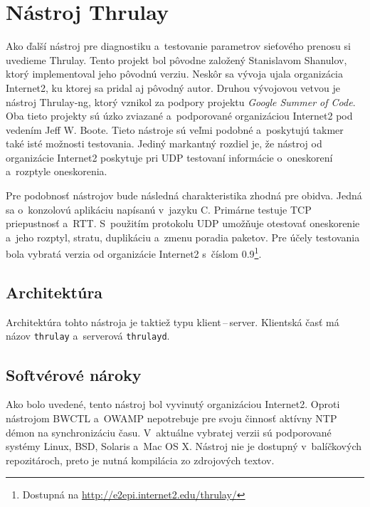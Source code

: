     \section{Nástroj Thrulay}
    Ako ďalší nástroj pre diagnostiku a~testovanie parametrov sieťového
    prenosu si uvedieme Thrulay. Tento projekt bol pôvodne založený Stanislavom 
    Shanulov, ktorý implementoval jeho pôvodnú verziu. Neskôr sa vývoja ujala
    organizácia Internet2, ku ktorej sa pridal aj pôvodný autor. Druhou
    vývojovou vetvou je nástroj Thrulay-ng, ktorý vznikol za podpory projektu 
    \emph{Google Summer of Code}. Oba tieto projekty sú úzko zviazané
    a~podporované organizáciou Internet2 pod vedením Jeff W. Boote. Tieto
    nástroje sú veľmi podobné a~poskytujú takmer také isté
    možnosti testovania. Jediný markantný rozdiel je, že nástroj od 
    organizácie Internet2 poskytuje pri UDP testovaní informácie
    o~oneskorení a~rozptyle oneskorenia.

    Pre podobnosť nástrojov bude následná charakteristika zhodná pre
    obidva. Jedná sa o~konzolovú aplikáciu napísanú v~jazyku C. Primárne testuje
    TCP priepustnosť a~RTT. S~použitím protokolu UDP umožňuje otestovať
    oneskorenie a~jeho rozptyl, stratu, duplikáciu a~zmenu poradia paketov.
    Pre účely testovania bola vybratá verzia od organizácie Internet2
    s~číslom 0.9\footnote{Dostupná na \url{http://e2epi.internet2.edu/thrulay/}}.


        \subsection{Architektúra}\label{thrulay_arch}
        Architektúra tohto nástroja je taktiež typu klient\,--\,server. Klientská
        časť má názov \texttt{thrulay} a~serverová \texttt{thrulayd}.

        \subsection{Softvérové nároky} \label{thrulay_sw}
        Ako bolo uvedené, tento nástroj bol vyvinutý organizáciou Internet2.
        Oproti nástrojom BWCTL a~OWAMP nepotrebuje pre svoju činnosť aktívny 
        NTP démon na synchronizáciu času. V~aktuálne vybratej verzii sú
        podporované systémy Linux, BSD, Solaris a~Mac OS X.
        Nástroj nie je dostupný v~balíčkových repozitároch, preto je nutná kompilácia zo 
        zdrojových textov. 

\newpage

